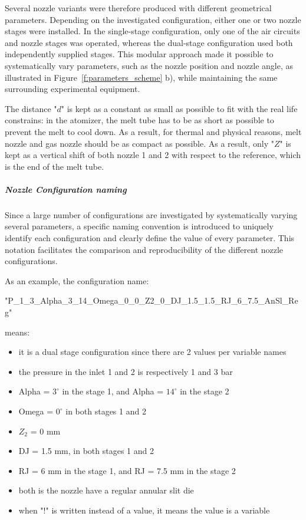 \documentclass[../../../main.tex]{subfiles}
\begin{document}
Several nozzle variants were therefore produced with different geometrical parameters. Depending on the investigated configuration, either one or two nozzle stages were installed. In the single-stage configuration, only one of the air circuits and nozzle stages was operated, whereas the dual-stage configuration used both independently supplied stages. This modular approach made it possible to systematically vary parameters, such as the nozzle position and nozzle angle, as illustrated in Figure~\ref{f:parameters_scheme} b), while maintaining the same surrounding experimental equipment. 

The distance "$d$" is kept as a constant as small as possible to fit with the real life constrains: in the atomizer, the melt tube has to be as short as possible to prevent the melt to cool down. As a result, for thermal and physical reasons, melt nozzle and gas nozzle should be as compact as possible. As a result, only "$Z$" is kept as a vertical shift of both nozzle 1 and 2 with respect to the reference, which is the end of the melt tube.

\subparagraph{Nozzle Configuration naming}

Since a large number of configurations are investigated by systematically varying several parameters, a specific naming convention is introduced to uniquely identify each configuration and clearly define the value of every parameter. This notation facilitates the comparison and reproducibility of the different nozzle configurations.

As an example, the configuration name:
\begin{center}{"P\_1\_3\_Alpha\_3\_14\_Omega\_0\_0\_Z2\_0\_DJ\_1.5\_1.5\_RJ\_6\_7.5\_AnSl\_Reg"}
\end{center}

means:

\begin{itemize}
    \item it is a dual stage configuration since there are 2 values per variable names
    \item the pressure in the inlet 1 and 2 is respectively 1 and 3 bar
    \item Alpha = $3^\circ$ in the stage 1, and Alpha = $14^\circ$ in the stage 2
    \item Omega = $0^\circ$ in both stages 1 and 2
    \item $Z_2$ = 0 mm
    \item DJ = 1.5 mm, in both stages 1 and 2
    \item RJ = 6 mm in the stage 1, and RJ = 7.5 mm in the stage 2
    \item both is the nozzle have a regular annular slit die
    \item when "!" is written instead of a value, it means the value is a variable
\end{itemize}
\end{document}
